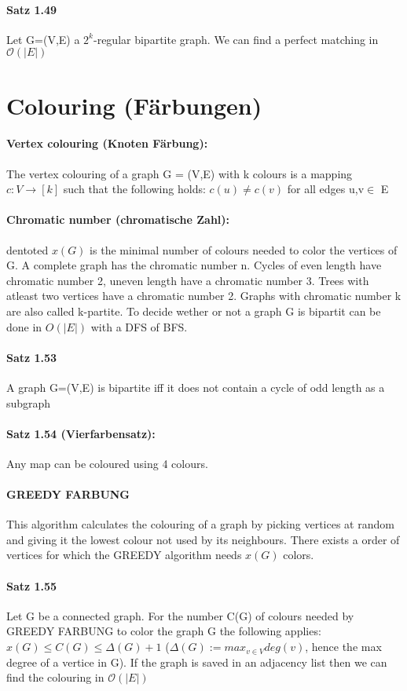 \documentclass[8pt]{extreport}
\begin{document}
\paragraph{Satz 1.49} Let G=(V,E) a $2^k$-regular bipartite graph. We can find a perfect matching in $\mathcal{O}(|E|)$
\section{Colouring (Färbungen)}
\paragraph{Vertex colouring (Knoten Färbung):} The vertex colouring of a graph G = (V,E) with k colours is a mapping $c:V\rightarrow [k]$ such that the following holds: $c(u) \neq c(v)$ for all edges {u,v}$\in$ E
\paragraph{Chromatic number (chromatische Zahl):} dentoted $\mathit{x}(G)$ is the minimal number of colours needed to color the vertices of G. A complete graph has the chromatic number n. Cycles of even length have chromatic number 2, uneven length have a chromatic number 3. Trees with atleast two vertices have a chromatic number 2. Graphs with chromatic number k are also called k-partite. To decide wether or not a graph G is bipartit can be done in $O(|E|)$ with a DFS of BFS.
\paragraph{Satz 1.53} A graph G=(V,E) is bipartite iff it does not contain a cycle of odd length as a subgraph
\paragraph{Satz 1.54 (Vierfarbensatz):} Any map can be coloured using 4 colours.
\paragraph{GREEDY FARBUNG} This algorithm calculates the colouring of a graph by picking vertices at random and giving it the lowest colour not used by its neighbours. There exists a order of vertices for which the GREEDY algorithm needs $\mathit{x}(G)$ colors.
\paragraph{Satz 1.55} Let G be a connected graph. For the number C(G) of colours needed by GREEDY FARBUNG to color the graph G the following applies: $\mathit{x}(G) \leq C(G) \leq \Delta(G) + 1$ ($\Delta (G) := max_{v\in V}deg(v)$, hence the max degree of a vertice in G). If the graph is saved in an adjacency list then we can find the colouring in $\mathcal{O}(|E|)$
\end{document}
